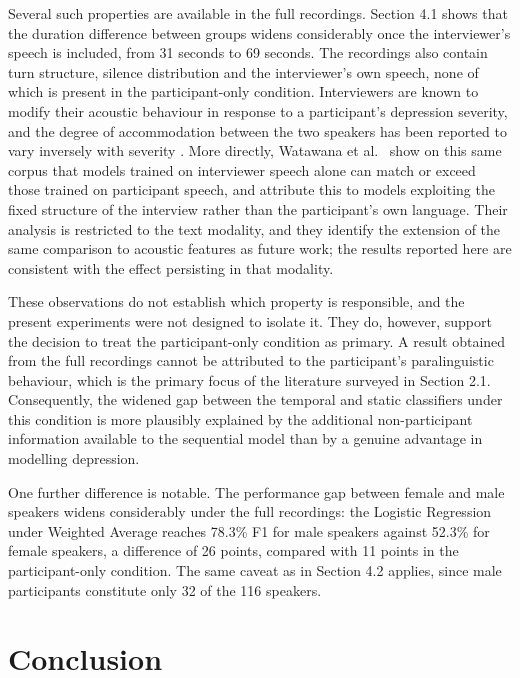 \documentclass{mproj}
\begin{document}
Several such properties are available in the full recordings. Section 4.1 shows that the duration difference between groups widens considerably once the interviewer's speech is included, from 31 seconds to 69 seconds. The recordings also contain turn structure, silence distribution and the interviewer's own speech, none of which is present in the participant-only condition. Interviewers are known to modify their acoustic behaviour in response to a participant's depression severity, and the degree of accommodation between the two speakers has been reported to vary inversely with severity \cite{scherer2014dyadic}. More directly, Watawana et al.\ \cite{watawana2026} show on this same corpus that models trained on interviewer speech alone can match or exceed those trained on participant speech, and attribute this to models exploiting the fixed structure of the interview rather than the participant's own language. Their analysis is restricted to the text modality, and they identify the extension of the same comparison to acoustic features as future work; the results reported here are consistent with the effect persisting in that modality.

These observations do not establish which property is responsible, and the present experiments were not designed to isolate it. They do, however, support the decision to treat the participant-only condition as primary. A result obtained from the full recordings cannot be attributed to the participant's paralinguistic behaviour, which is the primary focus of the literature surveyed in Section 2.1. Consequently, the widened gap between the temporal and static classifiers under this condition is more plausibly explained by the additional non-participant information available to the sequential model than by a genuine advantage in modelling depression.

One further difference is notable. The performance gap between female and male speakers widens considerably under the full recordings: the Logistic Regression under Weighted Average reaches 78.3\% F1 for male speakers against 52.3\% for female speakers, a difference of 26 points, compared with 11 points in the participant-only condition. The same caveat as in Section 4.2 applies, since male participants constitute only 32 of the 116 speakers.

\chapter{Conclusion}\label{conclusion}
\end{document}
